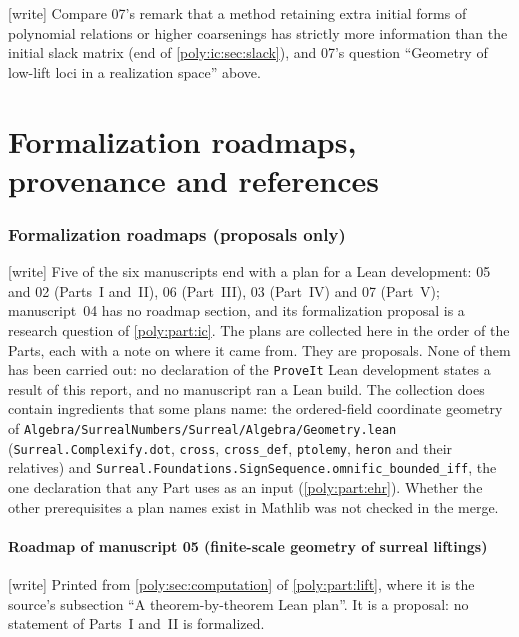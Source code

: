 \documentclass[11pt,a4paper]{article}
\numberwithin{equation}{section}
\theoremstyle{plain}
\newcommand{\wtag}{\textup{[write]}}%
\newcommand{\repo}{\texttt{ProveIt}}
\begin{document}
\wtag{} Compare 07's remark that a method retaining extra initial forms of
polynomial relations or higher coarsenings has strictly more information
than the initial slack matrix (end of \cref{poly:ic:sec:slack}), and 07's
question ``Geometry of low-lift loci in a realization space'' above.


\clearpage
\part*{Formalization roadmaps, provenance and references}

\section{Formalization roadmaps (proposals only)}\label{poly:sec:formalization}

\noindent\wtag{} Five of the six manuscripts end with a plan for a Lean
development: 05 and 02 (Parts~I and~II), 06 (Part~III), 03 (Part~IV) and
07 (Part~V); manuscript~04 has no roadmap section, and its formalization
proposal is a research question of \cref{poly:part:ic}. The plans are
collected here in the order of the Parts, each with a note on where it came
from. They are proposals. None of them has been carried out: no declaration
of the \repo{} Lean development states a result of this report, and no
manuscript ran a Lean build. The collection does contain ingredients that
some plans name: the ordered-field coordinate geometry of
\nolinkurl{Algebra/SurrealNumbers/Surreal/Algebra/Geometry.lean}
(\texttt{Surreal.Complexify.dot}, \texttt{cross}, \texttt{cross\_def},
\texttt{ptolemy}, \texttt{heron} and their relatives) and
\texttt{Surreal.Foundations.SignSequence.omnific\_bounded\_iff}, the one
declaration that any Part uses as an input (\cref{poly:part:ehr}). Whether
the other prerequisites a plan names exist in Mathlib was not checked in
the merge.

\subsection{Roadmap of manuscript 05 (finite-scale geometry of surreal liftings)}\label{poly:sec:leanplan}
\noindent\wtag{} Printed from \cref{poly:sec:computation} of \cref{poly:part:lift}, where it is the source's subsection ``A theorem-by-theorem Lean plan''. It is a proposal: no statement of Parts~I and~II is formalized.
\end{document}
